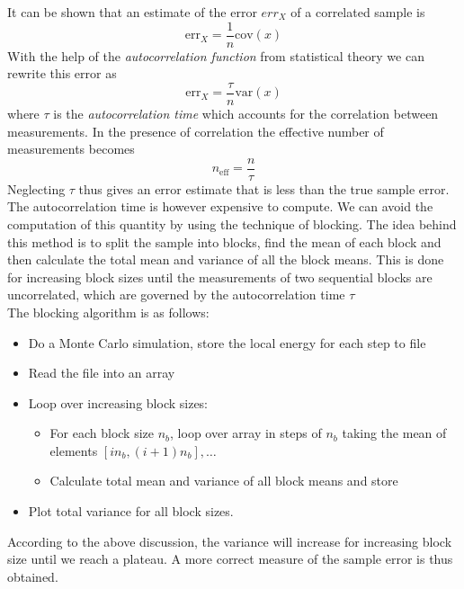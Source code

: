 \documentclass[english, a4paper]{article}
\begin{document}
\noindent It can be shown that an estimate of the error $err_X$ 
of a correlated sample is
\begin{equation}
 \textrm{err}_X = \frac{1}{n} \textrm{cov}(x)
\end{equation}
With the help of the \textit{autocorrelation function} from statistical theory we can rewrite
this error as
\begin{equation}
 \textrm{err}_X = \frac{\tau}{n} \textrm{var}(x)
\end{equation}
where $\tau$ is the \textit{autocorrelation time} which accounts
for the correlation between measurements. In the presence of
correlation the effective number of measurements becomes
\begin{equation}
 n_{\textrm{eff}} = \frac{n}{\tau}
\end{equation}
Neglecting $\tau$ thus gives an error estimate that is less than the true sample error. 
The autocorrelation time is however expensive to compute. We can avoid the computation of this quantity by using
the technique of blocking. The idea behind this method is to split the sample into blocks, find the mean of each block
and then calculate the total mean and variance of all the block means.
This is done for increasing block sizes until the measurements of two sequential blocks are uncorrelated, which
are governed by the autocorrelation time $\tau$\\

\noindent The blocking algorithm is as follows:
\begin{itemize}
 \item Do a Monte Carlo simulation, store the local energy for each step to file
 \item Read the file into an array
 \item Loop over increasing block sizes:
 \begin{itemize}
     \item For each block size $n_b$, loop over array in steps of $n_b$ taking the mean of elements
           $[in_b, (i+1)n_b] , \dots $
     \item Calculate total mean and variance of all block means and store
 \end{itemize}
 \item Plot total variance for all block sizes. 
\end{itemize}

According to the above discussion, the variance will increase for increasing block size until
we reach a plateau. A more correct measure of the sample error is thus obtained. 
\end{document}
